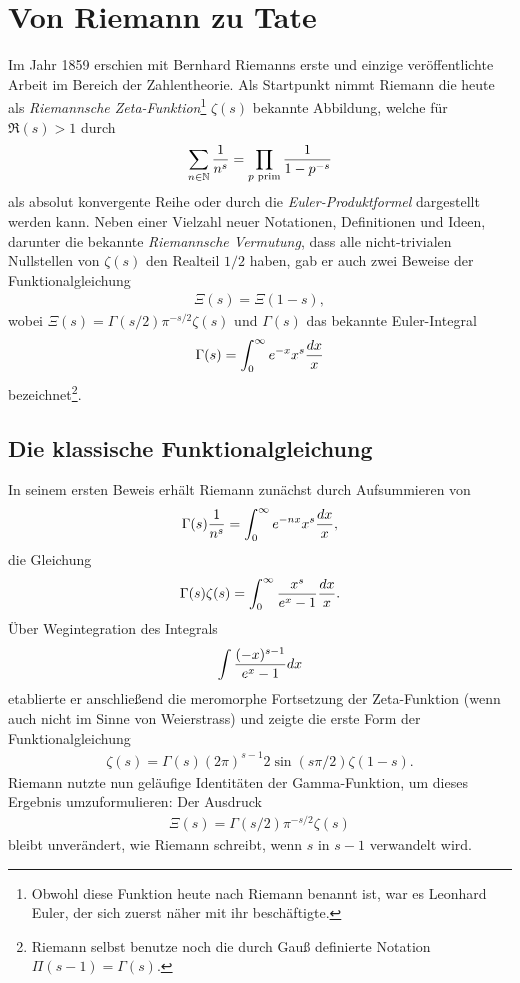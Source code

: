 
\section{Von Riemann zu Tate}
	Im Jahr 1859 erschien mit  \cite{riemann1859ueber} Bernhard Riemanns erste und einzige veröffentlichte Arbeit im Bereich der Zahlentheorie.
	Als Startpunkt nimmt Riemann die heute als \emph{Riemannsche Zeta-Funktion}\footnote{Obwohl diese Funktion heute nach Riemann benannt ist, war es Leonhard Euler, der sich zuerst näher mit ihr beschäftigte.} $\zeta(s)$ bekannte Abbildung, welche für $\Re(s)>1$ durch
	\begin{align*}
		\sum_{n\in \mathbb{N}} \frac{1}{n^s} = \prod_{p \text{ prim}} \frac{1}{1-p^{-s}}
	\end{align*}
	als absolut konvergente Reihe oder durch die \emph{Euler-Produktformel} dargestellt werden kann.
	Neben einer Vielzahl neuer Notationen, Definitionen und Ideen, darunter die bekannte \emph{Riemannsche Vermutung}, dass alle nicht-trivialen Nullstellen von $\zeta(s)$ den Realteil $1/2$ haben, gab er auch zwei Beweise der Funktionalgleichung
	\begin{align*}
		\Xi(s) = \Xi(1-s),
	\end{align*}
	wobei $\Xi(s) = \Gamma(s/2)\pi^{-s/2}\zeta(s)$ und $\Gamma(s)$ das bekannte Euler-Integral
	\begin{align*}
		\Gamma(s) = \int_0^\infty e^{-x} x^s \frac{d{x}}{x}
	\end{align*}
	bezeichnet\footnote{Riemann selbst benutze noch die durch Gauß definierte Notation $\Pi(s-1)=\Gamma(s)$.}.

\subsection{Die klassische Funktionalgleichung}
	In seinem ersten Beweis erhält Riemann zunächst durch Aufsummieren von
	\begin{align}\label{eq:riemannstart}
		\Gamma(s)\frac{1}{n^s} = \int_0^\infty e^{-nx}x^{s}\frac{d{x}}{x},
	\end{align}
	die Gleichung
	\begin{align*}
		\Gamma(s)\zeta(s) = \int_0^\infty \frac{x^{s}}{e^x-1} \frac{d{x}}{x}.
	\end{align*}
	Über Wegintegration des Integrals
	\begin{align*}
		\int \frac{(-x)^{s-1}}{e^x-1}d{x}
	\end{align*}
	etablierte er anschließend die meromorphe Fortsetzung der Zeta-Funktion (wenn auch nicht im Sinne von Weierstrass) und zeigte die erste Form der Funktionalgleichung
	\begin{align*}
		\zeta(s) = \Gamma(s)(2\pi)^{s-1} 2 \sin(s\pi/2) \zeta(1-s).
	\end{align*}
	Riemann nutzte nun geläufige Identitäten der Gamma-Funktion, um dieses Ergebnis umzuformulieren:
	Der Ausdruck
	\begin{align*}
		\Xi(s) = \Gamma(s/2)\pi^{-s/2}\zeta(s)
	\end{align*}
	bleibt unverändert, wie Riemann schreibt, \glqq wenn $s$ in $s-1$ verwandelt wird.\grqq{}
	
